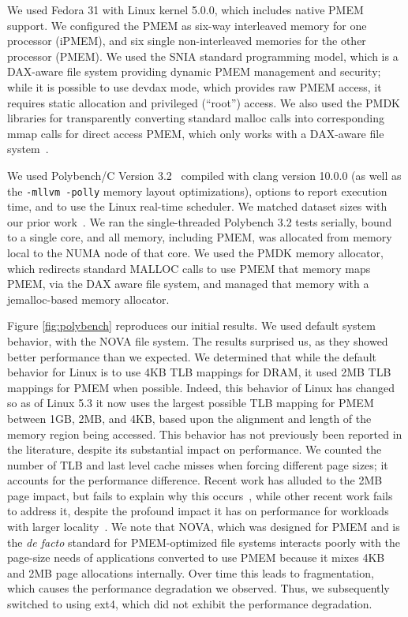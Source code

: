 We used Fedora 31 with Linux kernel 5.0.0, which includes native PMEM support. We configured the PMEM as six-way interleaved memory for one processor (iPMEM), and six single non-interleaved memories for the other processor (PMEM).  We used the SNIA standard programming model, which is a DAX-aware file system providing dynamic PMEM management and security; while it is possible to use devdax mode, which provides raw PMEM access, it requires static allocation and privileged (``root'') access.  We also used the PMDK libraries for transparently converting standard malloc calls into corresponding mmap calls for direct access PMEM, which only works with a DAX-aware file system~\cite{PMDK}.


We used Polybench/C Version 3.2~\cite{polybench,yuki2014understanding,yuki2015polybench} compiled with clang version 10.0.0 (as well as the \texttt{-mllvm -polly} memory layout optimizations), options to report execution time, and to use the Linux real-time scheduler. We matched dataset sizes with our prior work~\cite{doudali2017comerge}.  We ran the single-threaded Polybench 3.2 tests serially, bound to a single core, and all memory, including PMEM, was allocated from memory local to the NUMA node of that core.  We used the PMDK memory allocator, which redirects standard MALLOC calls to use PMEM that memory maps PMEM, via the DAX aware file system, and managed that memory with a jemalloc-based memory allocator.

Figure \ref{fig:polybench} reproduces our initial results.  We used default system behavior, with the NOVA file system.  The results surprised us, as they showed better performance than we expected.  We determined that while the default behavior for Linux is to use 4KB TLB mappings for DRAM, it used 2MB TLB mappings for PMEM when possible. Indeed, this behavior of Linux has changed so as of Linux 5.3 it now uses the largest possible TLB mapping for PMEM between 1GB, 2MB, and 4KB, based upon the alignment and length of the memory region being accessed.  This behavior has not previously been reported in the literature, despite its substantial impact on performance.  We counted the number of TLB and last level cache misses when forcing different page sizes; it accounts for the performance difference. Recent work has alluded to the 2MB page impact, but fails to explain why this occurs~\cite{kadekodi2019splitfs}, while other recent work fails to address it, despite the profound impact it has on performance for workloads with larger locality~\cite{dong2019performance,peng2019system}. We note that NOVA, which was designed for PMEM and is the \textit{de facto} standard for PMEM-optimized file systems interacts poorly with the page-size needs of applications converted to use PMEM because it mixes 4KB and 2MB page allocations internally.  Over time this leads to fragmentation, which causes the performance degradation we observed.  Thus, we subsequently switched to using ext4, which did not exhibit the performance degradation.

